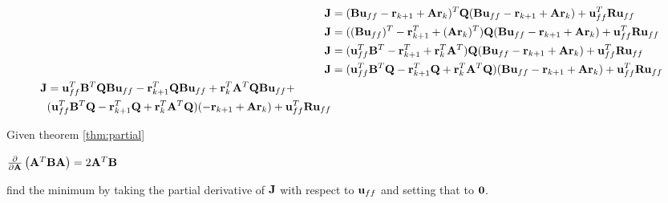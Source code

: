 \begin{align*}
  \mathbf{J} &= (\mathbf{B}\mathbf{u}_{ff} - \mathbf{r}_{k+1} + \mathbf{A}\mathbf{r}_k)^T \mathbf{Q}
    (\mathbf{B}\mathbf{u}_{ff} - \mathbf{r}_{k+1} + \mathbf{A}\mathbf{r}_k) +
    \mathbf{u}_{ff}^T\mathbf{R}\mathbf{u}_{ff} \\
  \mathbf{J} &= ((\mathbf{B}\mathbf{u}_{ff})^T - \mathbf{r}_{k+1}^T + (\mathbf{A}\mathbf{r}_k)^T)
    \mathbf{Q}(\mathbf{B}\mathbf{u}_{ff} - \mathbf{r}_{k+1} + \mathbf{A}\mathbf{r}_k) +
    \mathbf{u}_{ff}^T\mathbf{R}\mathbf{u}_{ff} \\
  \mathbf{J} &= (\mathbf{u}_{ff}^T\mathbf{B}^T - \mathbf{r}_{k+1}^T + \mathbf{r}_k^T\mathbf{A}^T)
    \mathbf{Q}(\mathbf{B}\mathbf{u}_{ff} - \mathbf{r}_{k+1} + \mathbf{A}\mathbf{r}_k) +
    \mathbf{u}_{ff}^T\mathbf{R}\mathbf{u}_{ff} \\
  \mathbf{J} &= (\mathbf{u}_{ff}^T\mathbf{B}^T\mathbf{Q} - \mathbf{r}_{k+1}^T\mathbf{Q} +
    \mathbf{r}_k^T\mathbf{A}^T\mathbf{Q})(\mathbf{B}\mathbf{u}_{ff} - \mathbf{r}_{k+1} +
    \mathbf{A}\mathbf{r}_k) + \mathbf{u}_{ff}^T\mathbf{R}\mathbf{u}_{ff} \\
  \begin{split}
    \mathbf{J} &= \mathbf{u}_{ff}^T\mathbf{B}^T\mathbf{Q}\mathbf{B}\mathbf{u}_{ff} -
      \mathbf{r}_{k+1}^T\mathbf{Q}\mathbf{B}\mathbf{u}_{ff} +
      \mathbf{r}_k^T\mathbf{A}^T\mathbf{Q}\mathbf{B}\mathbf{u}_{ff} + \\
      &(\mathbf{u}_{ff}^T\mathbf{B}^T\mathbf{Q} -
       \mathbf{r}_{k+1}^T\mathbf{Q} + \mathbf{r}_k^T\mathbf{A}^T\mathbf{Q})
      (-\mathbf{r}_{k+1} + \mathbf{A}\mathbf{r}_k) + \mathbf{u}_{ff}^T\mathbf{R}\mathbf{u}_{ff}
  \end{split}
\end{align*}

Given theorem \ref{thm:partial}

\begin{theorem}
  $\frac{\partial}{\partial\mathbf{A}}\left(\mathbf{A}^T\mathbf{B}\mathbf{A}\right) =
    2\mathbf{A}^T\mathbf{B}$
  \label{thm:partial}
\end{theorem}

find the minimum by taking the partial derivative of $\mathbf{J}$ with respect to
$\mathbf{u}_{ff}$ and setting that to $\mathbf{0}$.

